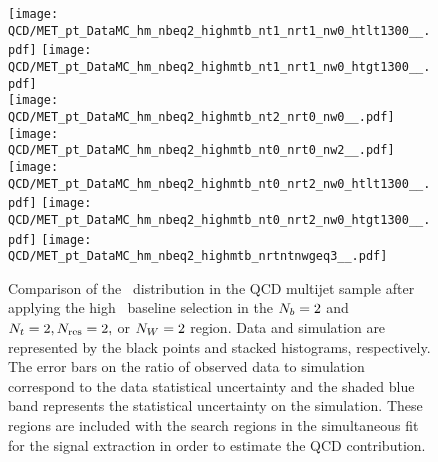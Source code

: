 \begin{figure}[!h]
	\begin{center}
  \texttt{[image: QCD/MET\_pt\_DataMC\_hm\_nbeq2\_highmtb\_nt1\_nrt1\_nw0\_htlt1300\_\_.pdf]}
  \texttt{[image: QCD/MET\_pt\_DataMC\_hm\_nbeq2\_highmtb\_nt1\_nrt1\_nw0\_htgt1300\_\_.pdf]} \\
  \texttt{[image: QCD/MET\_pt\_DataMC\_hm\_nbeq2\_highmtb\_nt2\_nrt0\_nw0\_\_.pdf]} 
  \texttt{[image: QCD/MET\_pt\_DataMC\_hm\_nbeq2\_highmtb\_nt0\_nrt0\_nw2\_\_.pdf]} \\
  \texttt{[image: QCD/MET\_pt\_DataMC\_hm\_nbeq2\_highmtb\_nt0\_nrt2\_nw0\_htlt1300\_\_.pdf]}  
  \texttt{[image: QCD/MET\_pt\_DataMC\_hm\_nbeq2\_highmtb\_nt0\_nrt2\_nw0\_htgt1300\_\_.pdf]}
  \texttt{[image: QCD/MET\_pt\_DataMC\_hm\_nbeq2\_highmtb\_nrtntnwgeq3\_\_.pdf]} \\
	\end{center}
	\caption[QCD Multijet HM Control Region $\nb=2$ with 2 heavy objects]{Comparison of the \met~distribution in the QCD multijet sample after applying the high \dm~baseline selection in the $\nb=2$ and $N_{t}=2, N_{\text{res}}=2,$ or $N_{W}=2$ region. Data and simulation are represented by the black points and stacked histograms, respectively. The error bars on the ratio of observed data to simulation correspond to the data statistical uncertainty and the shaded blue band represents the statistical uncertainty on the simulation. These regions are included with the search regions in the simultaneous fit for the signal extraction in order to estimate the QCD contribution.
	 }
	\label{fig:qcd-cr-datavsmc-hm-nb2-2}
\end{figure}

